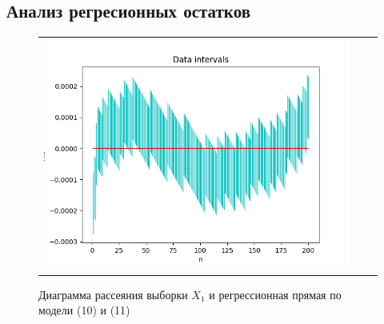 \documentclass[a4paper,14pt]{article}
\begin{document}
	\subsection{Анализ регресионных остатков}
	\begin{figure}[H]
		\begin{center}
			\begin{tabular}{ccc}
				\includegraphics[scale=0.8]{../image/regression_1.png}
			\end{tabular}
		\end{center}
		\caption{Диаграмма рассеяния выборки $X_1$ и регрессионная прямая по модели (10) и (11)} 
	\end{figure}
\end{document}
